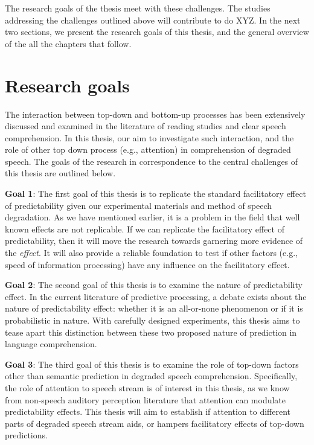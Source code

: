 \documentclass[a4paper, nobind]{templates/ociamthesis}
\begin{document}
The research goals of the thesis meet with these challenges.
The studies addressing the challenges outlined above will contribute to do XYZ.
In the next two sections, we present the research goals of this thesis, and the general overview of the all the chapters that follow.

\hypertarget{research-goals}{%
\section{Research goals}\label{research-goals}}

The interaction between top-down and bottom-up processes has been extensively discussed and examined in the literature of reading studies and clear speech comprehension.
In this thesis, our aim to investigate such interaction, and the role of other top down process (e.g., attention) in comprehension of degraded speech.
The goals of the research in correspondence to the central challenges of this thesis are outlined below.

\textbf{Goal 1}:
The first goal of this thesis is to replicate the standard facilitatory effect of predictability given our experimental materials and method of speech degradation.
As we have mentioned earlier, it is a problem in the field that well known effects are not replicable.
If we can replicate the facilitatory effect of predictability, then it will move the research towards garnering more evidence of the \emph{effect}.
It will also provide a reliable foundation to test if other factors (e.g., speed of information processing) have any influence on the facilitatory effect.

\textbf{Goal 2}:
The second goal of this thesis is to examine the nature of predictability effect.
In the current literature of predictive processing, a debate exists about the nature of predictability effect:
whether it is an all-or-none phenomenon or if it is probabilistic in nature.
With carefully designed experiments, this thesis aims to tease apart this distinction between these two proposed nature of prediction in language comprehension.

\textbf{Goal 3}:
The third goal of this thesis is to examine the role of top-down factors other than semantic prediction in degraded speech comprehension.
Specifically, the role of attention to speech stream is of interest in this thesis, as we know from non-speech auditory perception literature that attention can modulate predictability effects.
This thesis will aim to establish if attention to different parts of degraded speech stream aids, or hampers facilitatory effects of top-down predictions.
\end{document}
